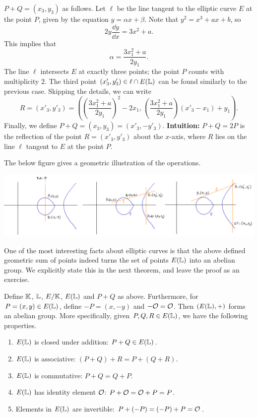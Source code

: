 \begin{defn}
\begin{enumerate}[(1)]
        $P + Q = (x_3, y_3)$ as follows. Let $\ell$ be the line tangent 
        to the elliptic curve $E$ at the point $P$, given by the equation 
        $y = \alpha x + \beta$. Note that $y^2 = x^3 + ax + b$, so 
        \[ 2y\frac{\dd y}{\dd x} = 3x^2 + a. \] 
        This implies that 
        \[ \alpha = \frac{3x_1^2 + a}{2y_1}. \] 
        The line $\ell$ intersects $E$ at exactly three points; the point $P$ 
        counts with multiplicity $2$. The third point $(x'_3, y'_3) \in \ell 
        \cap E(\mathbb{L})$ can be found similarly to the previous case. Skipping 
        the details, we can write 
        \[ R = (x'_3, y'_3) = \left( \left( \frac{3x_1^2+a}{2y_1} \right)^{\!2} 
        - 2x_1,\, \left( \frac{3x_1^2+a}{2y_1} \right) (x'_3 - x_1) + y_1 \right). \] 
        Finally, we define $P + Q = (x_3, y_3) = (x'_3, -y'_3)$. \textbf{Intuition:} 
        $P + Q = 2P$ is the reflection of the point $R = (x'_3, y'_3)$ about the 
        $x$-axis, where $R$ lies on the line $\ell$ tangent to $E$ at the point $P$. 
    \end{enumerate}
\end{defn}
The below figure gives a geometric illustration of the operations. 
\begin{center}
    \includegraphics[width=\textwidth]{Images/ec_group_law.png}
\end{center}
One of the most interesting facts about elliptic curves is that the above 
defined geometric sum of points indeed turns the set of points $E(\mathbb{L})$ 
into an abelian group. We explicitly state this in the next theorem, and leave 
the proof as an exercise. 

\begin{thm}
    Define $\mathbb{K}$, $\mathbb{L}$, $E/\mathbb{K}$, $E(\mathbb{L})$ and $P + Q$ as above. Furthermore, 
    for $P = (x, y) \in E(\mathbb{L})$, define $-P = (x, -y)$ and $-{\cal O} = {\cal O}$. 
    Then $(E(\mathbb{L}), +)$ forms an abelian group. More specifically, 
    given $P, Q, R \in E(\mathbb{L})$, we have the following properties. 
    \begin{enumerate}[(1)]
        \item $E(\mathbb{L})$ is closed under addition: $P + Q \in E(\mathbb{L})$. 
        \item $E(\mathbb{L})$ is associative: $(P + Q) + R = P + (Q + R)$. 
        \item $E(\mathbb{L})$ is commutative: $P + Q = Q + P$.
        \item $E(\mathbb{L})$ has identity element ${\cal O}$: $P + {\cal O} = {\cal O} + P = P$.
        \item Elements in $E(\mathbb{L})$ are invertible: $P + (-P) = (-P) + P = {\cal O}$. 
    \end{enumerate}
\end{thm}

